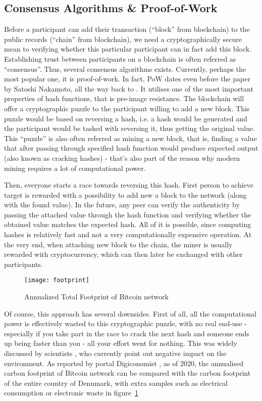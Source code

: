 \subsection{Consensus Algorithms \& Proof-of-Work}
Before a participant can add their transaction (``block'' from blockchain) to the public records (``chain'' from blockchain), we need a cryptographically secure mean to verifying whether this particular participant can in fact add this block. Establishing trust between participants on a blockchain is often referred as ``consensus''. Thus, several consensus algorithms exists. Currently, perhaps the most popular one, it is proof-of-work. In fact, PoW dates even before the paper by Satoshi Nakamoto, all the way back to \citet{jakobsson1999proofs}. It utilises one of the most important properties of hash functions, that is pre-image resistance. The blockchain will offer a cryptographic puzzle to the participant willing to add a new block. This puzzle would be based on reversing a hash, i.e. a hash would be generated and the participant would be tasked with reversing it, thus getting the original value. This ``puzzle'' is also often referred as mining a new block, that is, finding a value that after passing through specified hash function would produce expected output (also known as cracking hashes) - that's also part of the reason why modern mining requires a lot of computational power. 

Then, everyone starts a race towards reversing this hash. First person to achieve target is rewarded with a possibility to add new a block to the network (along with the found value). In the future, any peer can verify the authenticity by passing the attached value through the hash function and verifying whether the obtained value matches the expected hash. All of it is possible, since computing hashes is relatively fast and not a very computationally expensive operation. At the very end, when attaching new block to the chain, the miner is usually rewarded with cryptocurrency, which can then later be exchanged with other participants.

\begin{figure}[ht]
    \centering
    \texttt{[image: footprint]}
    \caption{Annualized Total Footprint of Bitcoin network \cite{index2017digiconomist}}
    \label{fig:footprint}
\end{figure}

Of course, this approach has several downsides. First of all, all the computational power is effectively wasted to this cryptographic puzzle, with no real end-use - especially if you take part in the race to crack the next hash and someone ends up being faster than you - all your effort went for nothing. This was widely discussed by scientists \cite{gervais2016security}, who currently point out negative impact on the environment. As reported by portal Digiconomist \cite{index2017digiconomist}, as of 2020, the annualised carbon footprint of Bitcoin network can be compared with the carbon footprint of the entire country of Dennmark, with extra samples such as electrical consumption or electronic waste in figure~\ref{fig:footprint}

